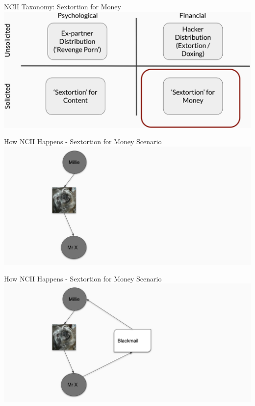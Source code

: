 \documentclass[nobackground,dvipsnames,table,aspectratio=169]{beamer}
\begin{document}
\begin{frame}{NCII Taxonomy: Sextortion for Money}
    \includegraphics[width=\textwidth]{ncii-taxonomy-3}
\end{frame}

\begin{frame}{How NCII Happens - Sextortion for Money Scenario}
    \includegraphics[width=\textwidth]{sextortion-money-ncii-diagram-1}
\end{frame}

\begin{frame}{How NCII Happens - Sextortion for Money Scenario}
    \includegraphics[width=\textwidth]{sextortion-money-ncii-diagram-2}
\end{frame}
\end{document}

